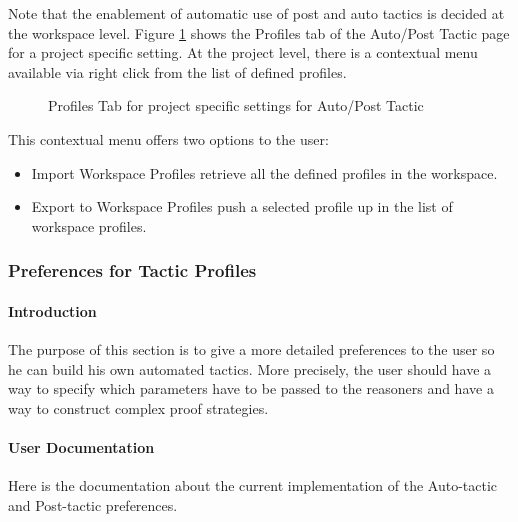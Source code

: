 Note that the enablement of automatic use of post and auto tactics is decided at the workspace level. Figure \ref{fig_ref_01_preferences12} shows the \textsf{Profiles} tab of the \textsf{Auto/Post Tactic} page for a project specific setting. At the project level, there is a contextual menu available via right click from the list of defined profiles. 

\begin{figure}[!ht]
\begin{center}
	\caption{Profiles Tab for project specific settings for Auto/Post Tactic}
	\label{fig_ref_01_preferences12}
\end{center}
\end{figure}

This contextual menu offers two options to the user:

\begin{itemize}
	\item Import Workspace Profiles retrieve all the defined profiles in the workspace.
	\item Export to Workspace Profiles push a selected profile up in the list of workspace profiles.
\end{itemize}

\subsubsection{Preferences for Tactic Profiles}
\label{preferences_for_the_automatic_tactics}

\paragraph{Introduction}

The purpose of this section is to give a more detailed preferences to the user so he can build his own automated tactics. More precisely, the user should have a way to specify which parameters have to be passed to the reasoners and have a way to construct complex proof strategies.

\paragraph{User Documentation}

Here is the documentation about the current implementation of the Auto-tactic and Post-tactic preferences.

